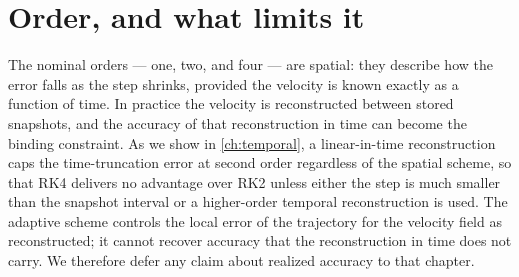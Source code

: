 \section{Order, and what limits it}\label{sec:int-order}

The nominal orders --- one, two, and four --- are spatial: they describe how the error falls as the step
shrinks, provided the velocity is known exactly as a function of time. In practice the velocity is
reconstructed between stored snapshots, and the accuracy of that reconstruction in time can become the
binding constraint. As we show in \cref{ch:temporal}, a linear-in-time reconstruction caps the
time-truncation error at second order regardless of the spatial scheme, so that RK4 delivers no advantage
over RK2 unless either the step is much smaller than the snapshot interval or a higher-order temporal
reconstruction is used. The adaptive scheme controls the local error of the trajectory for the velocity
field as reconstructed; it cannot recover accuracy that the reconstruction in time does not carry. We
therefore defer any claim about realized accuracy to that chapter.


